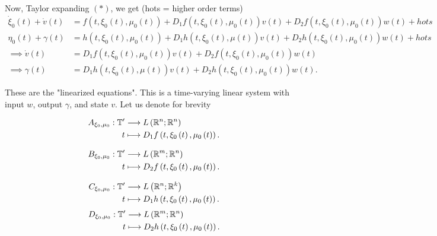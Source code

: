 Now, Taylor expanding $\left( * \right) $, we get (hots = higher order terms)
\begin{align*}
	\dot{\xi} _{0}\left( t \right) + \dot{v}\left( t \right) &= f\left( t, \xi_0 \left( t \right)  , \mu_0 \left( t \right)\right) + D_1 f\left( t, \xi_0 \left( t \right) , \mu_0 \left( t \right)  \right) v\left( t \right) + D_2 f\left( t, \xi_0\left( t \right) , \mu_0\left( t \right)  \right) w\left( t \right) + hots\\
	\eta_0 \left( t \right) + \gamma\left( t \right) &= h\left( t, \xi_0\left( t \right) , \mu_0\left( t \right)  \right)  + D_1 h\left( t, \xi_0 \left( t \right) , \mu\left( t \right)  \right) v\left( t \right) + D_2 h\left( t, \xi_0\left( t \right) , \mu_0\left( t \right)  \right) w\left( t \right) + hots \\
	\implies  \dot{v}\left( t \right) &=  D_1 f\left( t, \xi_0 \left( t \right) , \mu_0 \left( t \right)  \right) v\left( t \right) + D_2 f\left( t, \xi_0\left( t \right) , \mu_0\left( t \right)  \right) w\left( t \right) \\
	\implies \gamma\left( t \right) &=  D_1 h\left( t, \xi_0 \left( t \right) , \mu\left( t \right)  \right) v\left( t \right) + D_2 h\left( t, \xi_0\left( t \right) , \mu_0\left( t \right)  \right) w\left( t \right) 
.\end{align*}

These are the "linearized equations". This is a time-varying linear system with input $w$, output $\gamma$, and state  $v$. Let us denote for brevity

\begin{align*}
	A_{\xi_0, \mu_0}: \mathbb{T} ' &\longrightarrow L\left( \mathbb{R}^{n}; \mathbb{R}^{n} \right)  \\
	t &\longmapsto D_1 f\left( t, \xi_0 \left( t \right) , \mu_0 \left( t \right)  \right)  
.\end{align*}

\begin{align*}
	B_{\xi_0, \mu_0}: \mathbb{T} ' &\longrightarrow L\left( \mathbb{R}^{m}; \mathbb{R}^{n} \right)  \\
	t &\longmapsto D_2 f\left( t, \xi_0 \left( t \right) , \mu_0 \left( t \right)  \right)  
.\end{align*}

\begin{align*}
	C_{\xi_0, \mu_0}: \mathbb{T} ' &\longrightarrow L\left( \mathbb{R}^{n}; \mathbb{R}^{k} \right)  \\
	t &\longmapsto D_1 h\left( t, \xi_0 \left( t \right) , \mu_0 \left( t \right)  \right)  
.\end{align*}
\begin{align*}
	D_{\xi_0, \mu_0}: \mathbb{T} ' &\longrightarrow L\left( \mathbb{R}^{m}; \mathbb{R}^{n} \right)  \\
	t &\longmapsto D_2 h\left( t, \xi_0 \left( t \right) , \mu_0 \left( t \right)  \right)  
.\end{align*}

